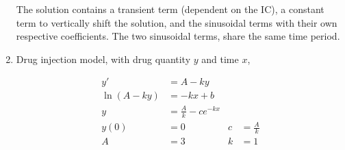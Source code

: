 \begin{enumerate}
          The solution contains a transient term (dependent on the IC), a constant
          term to vertically shift the solution,
          and the sinusoidal terms with their own respective coefficients.
          The two sinusoidal terms, share the same time period.
          \begin{figure}[H]
              \centering
          \end{figure}

    \item Drug injection model, with drug quantity $ y $ and time $ x $,

          \begin{align}
              y'           & = A - ky                                     \\
              \ln (A - ky) & = -kx + b                                    \\
              y            & = \frac{A}{k} - ce^{-kx}                     \\
              y(0)         & = 0                      & c & = \frac{A}{k} \\
              A            & = 3                      & k & = 1
          \end{align}


\end{enumerate}
